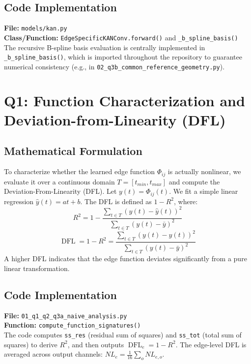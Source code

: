 \documentclass{article}
\begin{document}
\subsection{Code Implementation}
\textbf{File:} \texttt{models/kan.py} \\
\textbf{Class/Function:} \texttt{EdgeSpecificKANConv.forward()} and \texttt{\_b\_spline\_basis()} \\
The recursive B-spline basis evaluation is centrally implemented in \texttt{\_b\_spline\_basis()}, which is imported throughout the repository to guarantee numerical consistency (e.g., in \texttt{02\_q3b\_common\_reference\_geometry.py}).

\section{Q1: Function Characterization and Deviation-from-Linearity (DFL)}
\subsection{Mathematical Formulation}
To characterize whether the learned edge function $\Phi_{ij}$ is actually nonlinear, we evaluate it over a continuous domain $T = [t_{min}, t_{max}]$ and compute the Deviation-From-Linearity (DFL). Let $y(t) = \Phi_{ij}(t)$. We fit a simple linear regression $\hat{y}(t) = a t + b$.
The DFL is defined as $1 - R^2$, where:
\begin{equation}
R^2 = 1 - \frac{\sum_{t \in T} (y(t) - \hat{y}(t))^2}{\sum_{t \in T} (y(t) - \bar{y})^2}
\end{equation}
\begin{equation}
\operatorname{DFL} = 1 - R^2 = \frac{\sum_{t \in T} (y(t) - \hat{y}(t))^2}{\sum_{t \in T} (y(t) - \bar{y})^2}
\end{equation}
A higher DFL indicates that the edge function deviates significantly from a pure linear transformation.

\subsection{Code Implementation}
\textbf{File:} \texttt{01\_q1\_q2\_q3a\_naive\_analysis.py} \\
\textbf{Function:} \texttt{compute\_function\_signatures()} \\
The code computes \texttt{ss\_res} (residual sum of squares) and \texttt{ss\_tot} (total sum of squares) to derive $R^2$, and then outputs $\operatorname{DFL}_e = 1 - R^2$. The edge-level DFL is averaged across output channels: $NL_e = \frac{1}{16}\sum_o NL_{e,o}$.
\end{document}

